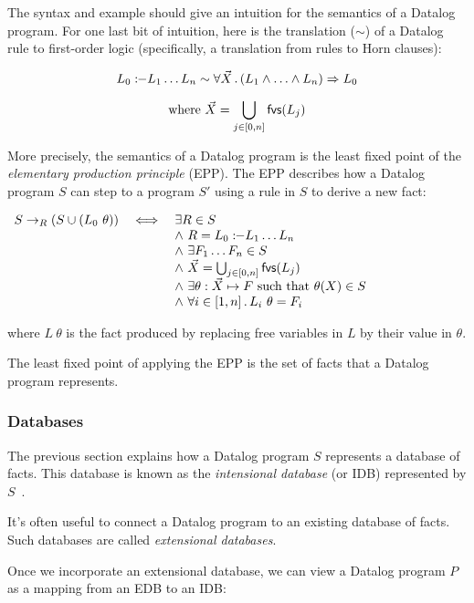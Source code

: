 \documentclass{article}
\begin{document}
The syntax and example should give an intuition for the semantics of a Datalog program.
For one last bit of intuition, here is the translation ($\sim$) of a Datalog rule to first-order logic (specifically, a translation from rules to Horn clauses):


\[
  L_0 :\!\!- L_1 \ldots L_n
  \sim
  \forall \vec{X}\,.\,(L_1 \wedge \ldots \wedge L_n) \Rightarrow L_0
\]

\[
  \mbox{where } \vec{X} = \bigcup_{j \in [0,n]} \mathsf{fvs}(L_j)
\]

More precisely, the semantics of a Datalog program is the least fixed point of the \emph{elementary production principle} (EPP).
The EPP describes how a Datalog program $S$ can step to a program $S'$ using a rule in $S$ to derive a new fact:

\begin{center}$\begin{array}{l l l}
  S \rightarrow_R (S \cup (L_0~\theta))
  & \iff & \exists R \in S
  \\ & & \wedge~R = L_0 :\!\!- L_1 \ldots L_n
  \\ & & \wedge~\exists F_1 \ldots F_n \in S
  \\ & & \wedge~\vec{X} = \bigcup_{j\in [0,n]} \mathsf{fvs}(L_j)
  \\ & & \wedge~\exists \theta : \vec{X} \mapsto F \mbox{ such that } \theta(X) \in S
  \\ & & \wedge~\forall i \in [1,n]\,.\, L_i~\theta = F_i
\end{array}$\end{center}
\noindent where $L~\theta$ is the fact produced by replacing free variables in $L$ by their value in $\theta$.

The least fixed point of applying the EPP is the set of facts that a Datalog program represents.


\subsubsection*{Databases}

The previous section explains how a Datalog program $S$ represents a database of facts.
This database is known as the \emph{intensional database} (or IDB) represented by $S$~\cite{cgt-ieee-1989}.

It's often useful to connect a Datalog program to an existing database of facts.
Such databases are called \emph{extensional databases}.

Once we incorporate an extensional database, we can view a Datalog program $P$ as a mapping from an EDB to an IDB:
\end{document}
